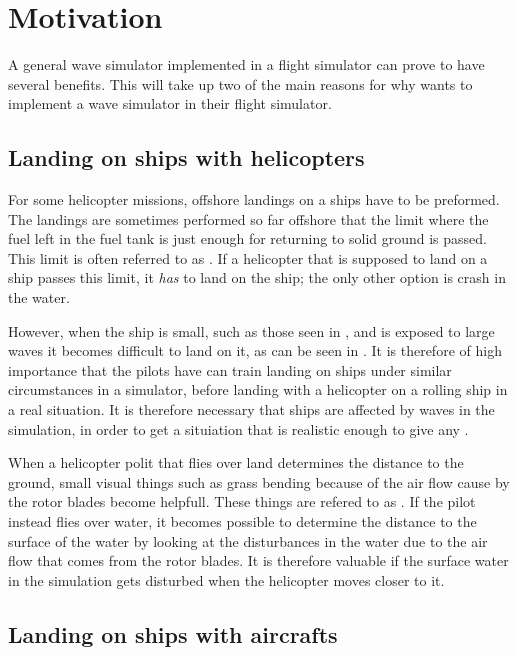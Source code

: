\chapter{Motivation}

A general wave simulator implemented in a flight simulator can prove to have several benefits. This \levelname will take up two of the main reasons for why \Saab wants to implement a wave simulator in their flight simulator.

\section{Landing on ships with helicopters}

For some helicopter missions, offshore landings on a ships have to be preformed. The landings are sometimes performed so far offshore that the limit where the fuel left in the fuel tank is just enough for returning to solid ground is passed. This limit is often referred to as . If a helicopter that is supposed to land on a ship passes this limit, it \emph{has} to land on the ship; the only other option is crash in the water.

However, when the ship is small, such as those seen in \citep{MrOawal2009,PrismDefence2010,KopulaDK2010}, and is exposed to large waves it becomes difficult to land on it, as can be seen in \citep{PrismDefence2010}. It is therefore of high importance that the pilots have can train landing on ships under similar circumstances in a simulator, before landing with a helicopter on a rolling ship in a real situation. It is therefore necessary that ships are affected by waves in the simulation, in order to get a situiation that is realistic enough to give any .

When a helicopter polit that flies over land determines the distance to the ground, small visual things such as grass bending because of the air flow cause by the rotor blades become helpfull. These things are refered to as . If the pilot instead flies over water, it becomes possible to determine the distance to the surface of the water by looking at the disturbances in the water due to the air flow that comes from the rotor blades. It is therefore valuable if the surface water in the simulation gets disturbed when the helicopter moves closer to it.

\section{Landing on ships with aircrafts}

